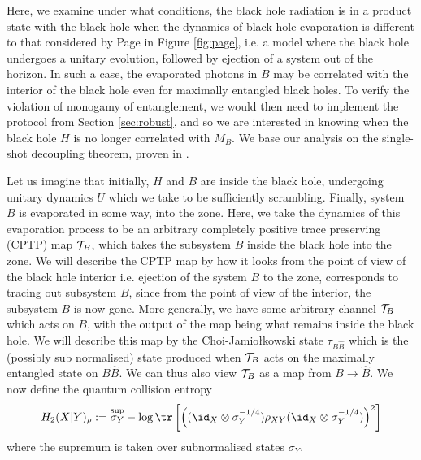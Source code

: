 \documentclass[11pt,a4paper]{article}
\begin{document}
Here, we examine under what conditions, the black hole radiation is in a product state with the black hole when the dynamics of black hole evaporation is different to 
that considered by Page in Figure \ref{fig:page}, i.e. a model where the black hole undergoes a unitary evolution, followed by ejection of a system out of the horizon.
In such a case, the evaporated photons in $B$ may be correlated with the interior of the black hole even for maximally entangled black holes. To verify the
violation of monogamy of entanglement, we would then need to implement the protocol from Section \ref{sec:robust}, and so we are interested in knowing 
when the black hole $H$ is no longer correlated with $M_B$. We base our analysis on the single-shot decoupling theorem, proven in \cite{dupuis2010one}.

Let us imagine that initially, $H$ and $B$ are inside the black hole, undergoing unitary dynamics $U$ which we take to be sufficiently scrambling. Finally, system $B$ is evaporated in some way, into the zone. Here, we take the dynamics of this evaporation process to be an arbitrary completely positive trace preserving (CPTP) map ${\cal T}_B$, which takes the subsystem $B$ inside the black hole into the zone.  We will describe the CPTP map by how it looks from the point of view of the black hole interior i.e. ejection of the system $B$ to the zone, corresponds to tracing out subsystem $B$, since from the point of view of the interior, the subsystem $B$ is now gone. More generally, we have some arbitrary channel ${\cal T}_B$ which acts
on $B$, with the output of the map being what remains inside the black hole. We will describe this map by the Choi-Jamio{\l}kowski state $\tau_{B{\hat B}}$ which is
the (possibly sub normalised) state produced when ${\cal T}_B$ acts on the maximally entangled state on $B{\hat B}$. 
We can thus also view ${\cal T}_B$ as a map from $B\rightarrow{\hat B}$.
We now define the quantum collision entropy
\begin{align}
H_2(X|Y)_{\rho}:=\overset{\sup}{\sigma_Y} -\log\tr\left[ \left((\id_X\otimes\sigma_Y^{-1/4})\rho_{XY}(\id_X\otimes\sigma_Y^{-1/4})\right)^2\right]
\end{align}
where the supremum is taken over subnormalised states $\sigma_Y$.
\end{document}
